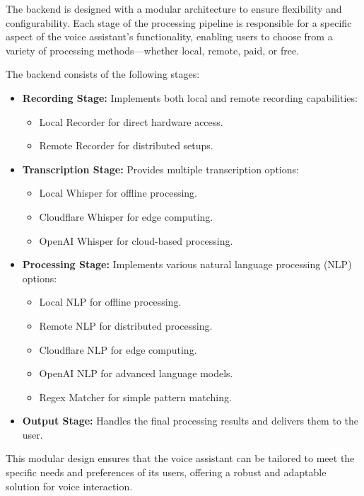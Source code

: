 The backend is designed with a modular architecture to ensure flexibility and configurability.
Each stage of the processing pipeline is responsible for a specific aspect of the voice assistant's functionality,
enabling users to choose from a variety of processing methods—whether local, remote, paid, or free.

The backend consists of the following stages:

\begin{itemize}
    \item \textbf{Recording Stage:} Implements both local and remote recording capabilities:
    \begin{itemize}
        \item Local Recorder for direct hardware access.
        \item Remote Recorder for distributed setups.
    \end{itemize}
    \item \textbf{Transcription Stage:} Provides multiple transcription options:
    \begin{itemize}
        \item Local Whisper for offline processing.
        \item Cloudflare Whisper for edge computing.
        \item OpenAI Whisper for cloud-based processing.
    \end{itemize}
    \item \textbf{Processing Stage:} Implements various natural language processing (NLP) options:
    \begin{itemize}
        \item Local NLP for offline processing.
        \item Remote NLP for distributed processing.
        \item Cloudflare NLP for edge computing.
        \item OpenAI NLP for advanced language models.
        \item Regex Matcher for simple pattern matching.
    \end{itemize}
    \item \textbf{Output Stage:} Handles the final processing results and delivers them to the user.
\end{itemize}

This modular design ensures that the voice assistant can be tailored
to meet the specific needs and preferences of its users,
offering a robust and adaptable solution for voice interaction.

